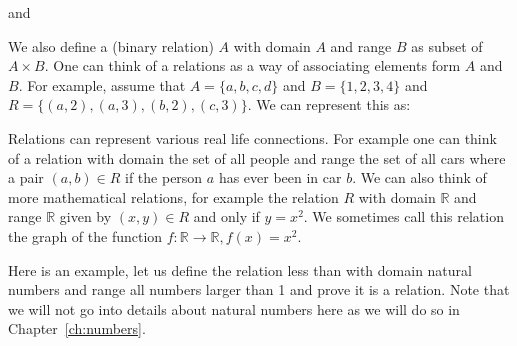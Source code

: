  
 and
 
 
 
 
 We also define a (binary relation) $A$ with domain $A$ and range $B$ as subset of $A\times B$. One can think of a relations as a way of associating elements form $A$ and  $B$. For example, assume that $A=\{a,b,c,d\}$ and $B=\{1,2,3,4\}$ and $R=\{(a,2), (a,3), (b,2), (c,3)\}$. We can represent this as:
 
 \begin{figure}
 \centering
\end{figure}

Relations can represent various real life connections. For example one can think of a relation with domain the set of all people and range the set of all cars where a pair $(a, b)\in R$ if the person $a$ has ever been in car $b$. We can also think of more mathematical relations, for example the relation $R$ with domain $\mathbb{R}$ and range $\mathbb{R}$ given by $(x,y)\in R$ and only if $y=x^2$. We sometimes call this relation the graph of the function $f:\mathbb{R}\rightarrow \mathbb{R}, f(x)=x^2$.
 
 
 Here is an example, let us define the relation less than with domain natural numbers and range all numbers larger than 1 and prove it is a relation. Note that we will not go into details about natural numbers here as we will do so in Chapter~\ref{ch:numbers}.
 
